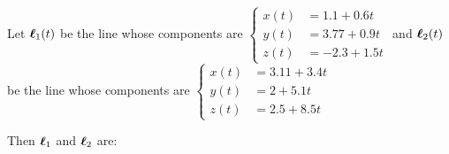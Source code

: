 \documentclass{ximera}
\author{Gregory Hartman \and Matthew Carr}
\begin{document}
\begin{exercise}




Let $\boldsymbol{\ell}_{1}(t)$ be the line whose components are $\left\{ \begin{aligned}x(t) & =1.1+0.6t\\
y(t) & =3.77+0.9t\\
z(t) & =-2.3+1.5t
\end{aligned}
\right.$  and $\boldsymbol{\ell}_{2}(t)$ be the line whose components are $\left\{ \begin{aligned}x(t) & =3.11+3.4t\\
y(t) & =2+5.1t\\
z(t) & =2.5+8.5t
\end{aligned}
\right.$

Then $\boldsymbol{\ell}_{1}$ and $\boldsymbol{\ell}_{2}$ are: 

\begin{multipleChoice}
\end{multipleChoice}


\end{exercise}
\end{document}
